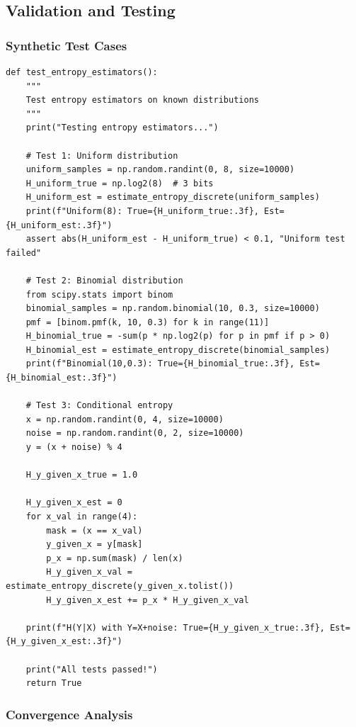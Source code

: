 \documentclass[10pt, letterpaper]{article}
\begin{document}
\subsection{Validation and Testing}

\subsubsection{Synthetic Test Cases}

\begin{lstlisting}
def test_entropy_estimators():
    """
    Test entropy estimators on known distributions
    """
    print("Testing entropy estimators...")

    # Test 1: Uniform distribution
    uniform_samples = np.random.randint(0, 8, size=10000)
    H_uniform_true = np.log2(8)  # 3 bits
    H_uniform_est = estimate_entropy_discrete(uniform_samples)
    print(f"Uniform(8): True={H_uniform_true:.3f}, Est={H_uniform_est:.3f}")
    assert abs(H_uniform_est - H_uniform_true) < 0.1, "Uniform test failed"

    # Test 2: Binomial distribution
    from scipy.stats import binom
    binomial_samples = np.random.binomial(10, 0.3, size=10000)
    pmf = [binom.pmf(k, 10, 0.3) for k in range(11)]
    H_binomial_true = -sum(p * np.log2(p) for p in pmf if p > 0)
    H_binomial_est = estimate_entropy_discrete(binomial_samples)
    print(f"Binomial(10,0.3): True={H_binomial_true:.3f}, Est={H_binomial_est:.3f}")

    # Test 3: Conditional entropy
    x = np.random.randint(0, 4, size=10000)
    noise = np.random.randint(0, 2, size=10000)
    y = (x + noise) % 4

    H_y_given_x_true = 1.0

    H_y_given_x_est = 0
    for x_val in range(4):
        mask = (x == x_val)
        y_given_x = y[mask]
        p_x = np.sum(mask) / len(x)
        H_y_given_x_val = estimate_entropy_discrete(y_given_x.tolist())
        H_y_given_x_est += p_x * H_y_given_x_val

    print(f"H(Y|X) with Y=X+noise: True={H_y_given_x_true:.3f}, Est={H_y_given_x_est:.3f}")

    print("All tests passed!")
    return True
\end{lstlisting}

\subsubsection{Convergence Analysis}
\end{document}
